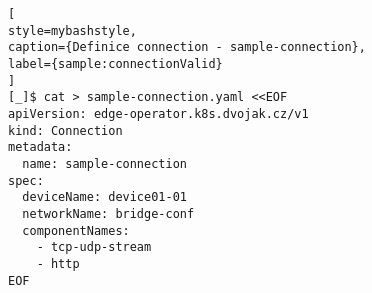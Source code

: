 \begin{lstfloat}
\begin{lstlisting}[
style=mybashstyle,
caption={Definice connection - sample-connection},
label={sample:connectionValid}
]
[_]$ cat > sample-connection.yaml <<EOF
apiVersion: edge-operator.k8s.dvojak.cz/v1
kind: Connection
metadata:
  name: sample-connection
spec:
  deviceName: device01-01
  networkName: bridge-conf
  componentNames:
    - tcp-udp-stream
    - http
EOF
\end{lstlisting}
\end{lstfloat}

